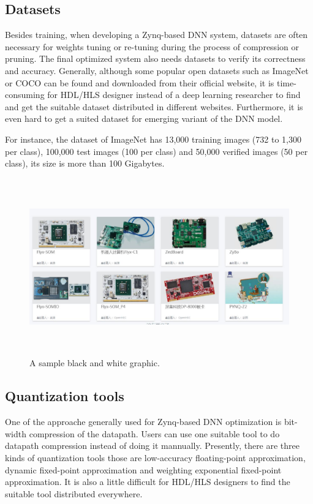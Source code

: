 \subsection{Datasets}
Besides training, when developing a Zynq-based DNN system, datasets are often necessary for weights tuning or re-tuning during the process of compression or pruning. The final optimized system also needs datasets to verify its correctness and accuracy. Generally, although some popular open datasets such as ImageNet or COCO can be found and downloaded from their official website, it is time-consuming for HDL/HLS designer instead of a deep learning researcher to find and get the suitable dataset distributed in different websites. Furthermore, it is even hard to get a suited dataset for emerging variant of the DNN model. 

For instance, the dataset of ImageNet has 13,000 training images (732 to 1,300 per class), 100,000 test images (100 per class) and 50,000 verified images (50 per class), its size is more than 100 Gigabytes.

\begin{figure}
\includegraphics[height=3in, width=6in]{figure_1}
\caption{A sample black and white graphic.}
\end{figure}

\subsection{Quantization tools}
One of the approache generally used for Zynq-based DNN optimization is bit-width compression of the datapath. Users can use one suitable tool to do datapath compression instead of doing it mannually. 
Presently, there are three kinds of quantization tools those are low-accuracy floating-point approximation, dynamic fixed-point approximation and weighting exponential fixed-point approximation. It is also a little difficult for HDL/HLS designers to find the suitable tool distributed everywhere.

